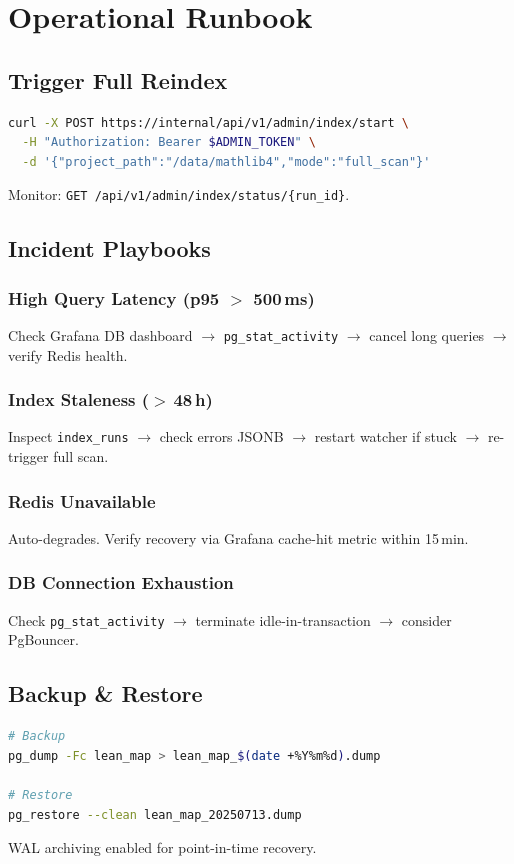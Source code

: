 \chapter{Operational Runbook}

\section{Trigger Full Reindex}
\begin{lstlisting}[language=bash]
curl -X POST https://internal/api/v1/admin/index/start \
  -H "Authorization: Bearer $ADMIN_TOKEN" \
  -d '{"project_path":"/data/mathlib4","mode":"full_scan"}'
\end{lstlisting}

Monitor: \texttt{GET /api/v1/admin/index/status/\{run\_id\}}.

\section{Incident Playbooks}

\subsection{High Query Latency (p95 $>$ 500\,ms)}
Check Grafana DB dashboard $\to$ \texttt{pg\_stat\_activity} $\to$
cancel long queries $\to$ verify Redis health.

\subsection{Index Staleness ($>$\,48\,h)}
Inspect \texttt{index\_runs} $\to$ check errors JSONB $\to$ restart
watcher if stuck $\to$ re-trigger full scan.

\subsection{Redis Unavailable}
Auto-degrades.  Verify recovery via Grafana cache-hit metric within 15\,min.

\subsection{DB Connection Exhaustion}
Check \texttt{pg\_stat\_activity} $\to$ terminate idle-in-transaction
$\to$ consider PgBouncer.

\section{Backup \& Restore}
\begin{lstlisting}[language=bash]
# Backup
pg_dump -Fc lean_map > lean_map_$(date +%Y%m%d).dump

# Restore
pg_restore --clean lean_map_20250713.dump
\end{lstlisting}

WAL archiving enabled for point-in-time recovery.
